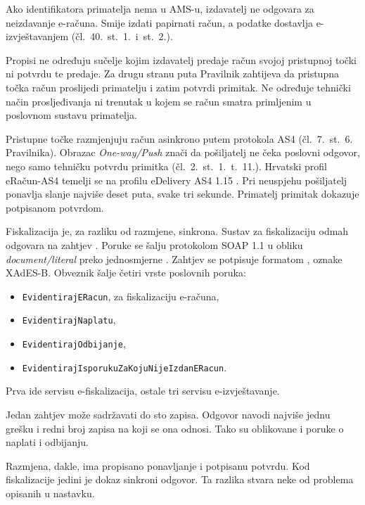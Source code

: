 Ako identifikatora primatelja nema u AMS-u, izdavatelj ne odgovara za
neizdavanje e-računa. Smije izdati papirnati račun, a podatke dostavlja
e-izvještavanjem (čl.~40.~st.~1.\ i~st.~2.).

Propisi ne određuju sučelje kojim izdavatelj predaje račun svojoj
pristupnoj točki ni potvrdu te predaje. Za drugu stranu puta Pravilnik
zahtijeva da pristupna točka račun proslijedi primatelju i zatim potvrdi
primitak. Ne određuje tehnički način prosljeđivanja ni trenutak u kojem se
račun smatra primljenim u poslovnom sustavu primatelja.

Pristupne točke razmjenjuju račun asinkrono putem protokola AS4
(čl.~7.~st.~6. Pravilnika). Obrazac \emph{One-way/Push} znači da pošiljatelj ne
čeka poslovni odgovor, nego samo tehničku potvrdu primitka
(čl.~2.~st.~1.~t.~11.). Hrvatski profil eRačun-AS4 temelji se na profilu
eDelivery AS4 1.15 \cite{pu2025as4profil, cef2020as4v115}. Pri neuspjehu
pošiljatelj ponavlja slanje najviše deset puta, svake tri sekunde.
Primatelj primitak dokazuje potpisanom potvrdom.

Fiskalizacija je, za razliku od razmjene, sinkrona. Sustav za
fiskalizaciju odmah odgovara na zahtjev \cite{pu2026tehspec}. Poruke se
šalju protokolom SOAP 1.1 u obliku \emph{document/literal} preko jednosmjerne
.
Zahtjev se potpisuje formatom , oznake XAdES-B. Obveznik šalje četiri vrste poslovnih
poruka:

\begin{itemize}[itemsep=1pt, topsep=4pt]
  \item \texttt{EvidentirajERacun}, za fiskalizaciju e-računa,
  \item \texttt{EvidentirajNaplatu},
  \item \texttt{EvidentirajOdbijanje},
  \item \texttt{EvidentirajIsporukuZaKojuNijeIzdanERacun}.
\end{itemize}

Prva ide servisu e-fiskalizacija, ostale tri servisu e-izvještavanje.

Jedan zahtjev može sadržavati do sto zapisa. Odgovor navodi najviše jednu
grešku i redni broj zapisa na koji se ona odnosi. Tako su oblikovane i
poruke o naplati i odbijanju.

Razmjena, dakle, ima propisano ponavljanje i potpisanu potvrdu. Kod
fiskalizacije jedini je dokaz sinkroni odgovor. Ta razlika stvara neke od
problema opisanih u nastavku.

